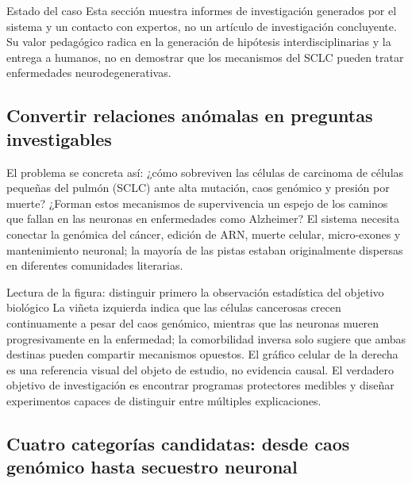 
\begin{warningbox}{Estado del caso}
Esta sección muestra informes de investigación generados por el sistema y un contacto con expertos, no un artículo de investigación concluyente. Su valor pedagógico radica en la generación de hipótesis interdisciplinarias y la entrega a humanos, no en demostrar que los mecanismos del SCLC pueden tratar enfermedades neurodegenerativas.
\end{warningbox}

\subsection{Convertir relaciones anómalas en preguntas investigables}

El problema se concreta así: ¿cómo sobreviven las células de carcinoma de células pequeñas del pulmón (SCLC) ante alta mutación, caos genómico y presión por muerte? ¿Forman estos mecanismos de supervivencia un espejo de los caminos que fallan en las neuronas en enfermedades como Alzheimer? El sistema necesita conectar la genómica del cáncer, edición de ARN, muerte celular, micro-exones y mantenimiento neuronal; la mayoría de las pistas estaban originalmente dispersas en diferentes comunidades literarias.


\begin{knowledgebox}{Lectura de la figura: distinguir primero la observación estadística del objetivo biológico}
La viñeta izquierda indica que las células cancerosas crecen continuamente a pesar del caos genómico, mientras que las neuronas mueren progresivamente en la enfermedad; la comorbilidad inversa solo sugiere que ambas destinas pueden compartir mecanismos opuestos. El gráfico celular de la derecha es una referencia visual del objeto de estudio, no evidencia causal. El verdadero objetivo de investigación es encontrar programas protectores medibles y diseñar experimentos capaces de distinguir entre múltiples explicaciones.
\end{knowledgebox}

\subsection{Cuatro categorías candidatas: desde caos genómico hasta secuestro neuronal}

